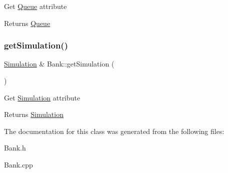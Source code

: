 Get \hyperlink{classQueue}{Queue} attribute \begin{DoxyReturn}{Returns}
\hyperlink{classQueue}{Queue} 
\end{DoxyReturn}
\mbox{\label{classBank_a8d181c1cfdea6b987602f9e2954cb7ad}} 
\subsubsection{\texorpdfstring{get\+Simulation()}{getSimulation()}}
{\footnotesize\ttfamily \hyperlink{classSimulation}{Simulation} \& Bank\+::get\+Simulation (\begin{DoxyParamCaption}{ }\end{DoxyParamCaption})}

Get \hyperlink{classSimulation}{Simulation} attribute \begin{DoxyReturn}{Returns}
\hyperlink{classSimulation}{Simulation} 
\end{DoxyReturn}


The documentation for this class was generated from the following files\+:\begin{DoxyCompactItemize}
\item 
Bank.\+h\item 
Bank.\+cpp\end{DoxyCompactItemize}
